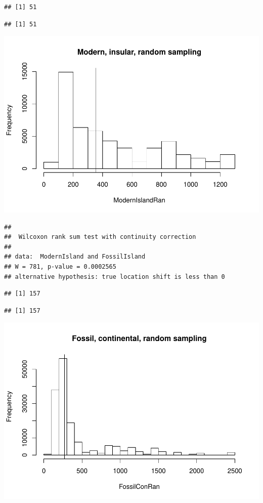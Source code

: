 \documentclass[]{article}
\begin{document}
\begin{verbatim}
## [1] 51
\end{verbatim}

\begin{verbatim}
## [1] 51
\end{verbatim}

\includegraphics{MA_JJ_files/figure-latex/RSMFCI-1.pdf}

\begin{verbatim}
## 
##  Wilcoxon rank sum test with continuity correction
## 
## data:  ModernIsland and FossilIsland
## W = 781, p-value = 0.0002565
## alternative hypothesis: true location shift is less than 0
\end{verbatim}

\begin{verbatim}
## [1] 157
\end{verbatim}

\begin{verbatim}
## [1] 157
\end{verbatim}

\includegraphics{MA_JJ_files/figure-latex/RSMFCI-2.pdf}
\end{document}
